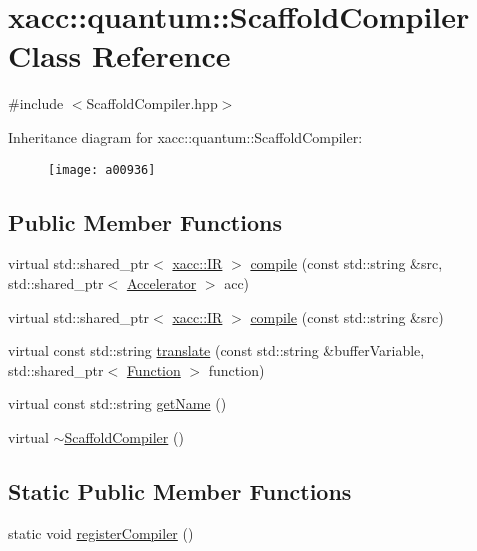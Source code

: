 \hypertarget{a00936}{}\section{xacc\+:\+:quantum\+:\+:Scaffold\+Compiler Class Reference}
\label{a00936}


{\ttfamily \#include $<$Scaffold\+Compiler.\+hpp$>$}

Inheritance diagram for xacc\+:\+:quantum\+:\+:Scaffold\+Compiler\+:\begin{figure}[H]
\begin{center}
\leavevmode
\texttt{[image: a00936]}
\end{center}
\end{figure}
\subsection*{Public Member Functions}
\begin{DoxyCompactItemize}
\item 
virtual std\+::shared\+\_\+ptr$<$ \hyperlink{a01148}{xacc\+::\+IR} $>$ \hyperlink{a00936_a7caede75bb2304ba405966651b115543}{compile} (const std\+::string \&src, std\+::shared\+\_\+ptr$<$ \hyperlink{a01084}{Accelerator} $>$ acc)
\item 
virtual std\+::shared\+\_\+ptr$<$ \hyperlink{a01148}{xacc\+::\+IR} $>$ \hyperlink{a00936_a3736ecc229fe6acdd4c991e85d7a1f08}{compile} (const std\+::string \&src)
\item 
virtual const std\+::string \hyperlink{a00936_ac7ca2941e987ba579c6f50cfbd7fb0dc}{translate} (const std\+::string \&buffer\+Variable, std\+::shared\+\_\+ptr$<$ \hyperlink{a01124}{Function} $>$ function)
\item 
virtual const std\+::string \hyperlink{a00936_a3f537054a3924a1d14f4ceb0f0181161}{get\+Name} ()
\item 
virtual \hyperlink{a00936_afb26398b07377ab9ddebc43a9376a6dd}{$\sim$\+Scaffold\+Compiler} ()
\end{DoxyCompactItemize}
\subsection*{Static Public Member Functions}
\begin{DoxyCompactItemize}
\item 
static void \hyperlink{a00936_aed16dda1e919e5af6de9953a656f62ce}{register\+Compiler} ()
\end{DoxyCompactItemize}
